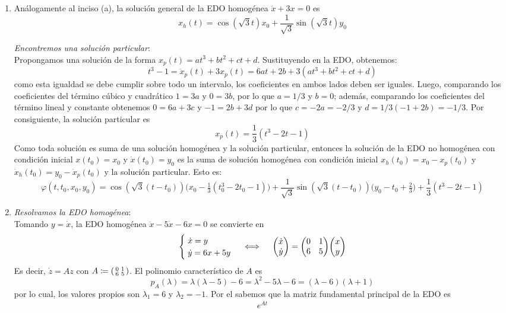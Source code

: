 \begin{sol}
\begin{enumerate}[leftmargin=*, label=(\alph*)]
\item Análogamente al inciso (a), la solución general de la EDO homogénea $\ddot{x} + 3x = 0$ es
\[
x_h(t) =
        \cos(\sqrt3t) x_0 + \frac{1}{\sqrt3}\sin(\sqrt3t) y_0
\]
\hphantom{a}\par
\emph{Encontremos una solución particular}:\\
Propongamos una solución de la forma $x_p(t) = at^3 + bt^2 + ct + d$. Sustituyendo en la EDO, obtenemos:
\[
t^3 - 1 = 
\ddot{x}_p(t) + 3x_p(t) = 6at + 2b + 3(at^3 + bt^2 + ct + d)
\]
como esta igualdad se debe cumplir sobre todo un intervalo, los coeficientes en ambos lados deben ser iguales. Luego, comparando los coeficientes del término cúbico y cuadrático $1 = 3a$ y $0 = 3b$, por lo que $a = 1/3$ y $b=0$; además, comparando los coeficientes del término lineal y constante obtenemos $0 = 6a + 3c$ y $-1 = 2b + 3d$ por lo que $c = -2a = -2/3$ y $d = 1/3(-1+2b) = -1/3$. Por consiguiente, la solución particular es
\[
x_p(t) = \frac{1}{3}(t^3 - 2t  - 1)
\]
Como toda solución es suma de una solución homogénea y la solución particular, entonces la solución de la EDO no homogénea con condición inicial $x(t_0) = x_0$ y $\dot{x}(t_0) = y_0$ es la suma de solución homogénea con condición inicial $x_h(t_0) = x_0 - x_p(t_0)$ y $\dot{x}_h(t_0) = y_0 - \dot{x}_p(t_0)$ y la solución particular. Esto es:
\[
\varphi(t,t_0,x_0,y_0) =
        \cos(\sqrt3(t-t_0))\big(x_0 - \tfrac13(t_0^3 - 2t_0  - 1)\big) + \frac{1}{\sqrt3}\sin(\sqrt3(t-t_0))\big(y_0 - t_0 + \tfrac23 \big) + \frac13(t^3 - 2t - 1)
\]
\item \emph{Resolvamos la EDO homogénea}:\\
Tomando $y = \dot{x}$, la EDO homogénea $\ddot{x} - 5\dot{x} - 6x = 0$ se convierte en
\[
\begin{cases}
\;\dot{x} = y\\
\;\dot{y} = 6x + 5y
\end{cases}%
\iff\quad%
\mqty(\dot{x}\\\dot{y}) = \mqty(0&1\\6&5)\mqty(x\\y)
\]
Es decir, $\dot{z} = Az$ con $A \coloneq \smqty(0&1\\6&5)$. El polinomio característico de $A$ es 
\[
p_A(\lambda) = \lambda(\lambda - 5)  - 6 = \lambda^2 - 5\lambda - 6 = (\lambda - 6)(\lambda + 1)
\]
por lo cual, los valores propios son $\lambda_1 = 6$ y $\lambda_2 = -1$. Por el  sabemos que la matriz fundamental principal de la EDO es
\begin{align*}
e^{At}%

\end{align*}
\end{enumerate}
\end{sol}
